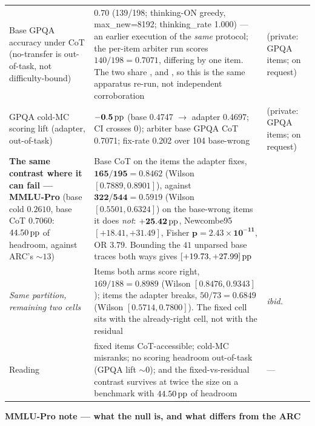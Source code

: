 \begin{table}[tbp]
\begin{threeparttable}
\begin{tabular}{L{5.2cm} L{6.4cm} L{3.2cm}}
\addlinespace
Base GPQA accuracy under CoT (no-transfer is out-of-task, not difficulty-bound) &
$\mathbf{0.70}$ (139/198; thinking-ON greedy, max\_new=8192; thinking\_rate 1.000)
--- an earlier execution of the \emph{same} protocol; the per-item arbiter run scores
$140/198 = 0.7071$, differing by one item. The two share ,
 and , so this is the same apparatus
re-run, not independent corroboration &
 (private: GPQA items; on request)  \\
\addlinespace
GPQA cold-MC scoring lift (adapter, out-of-task) & $\mathbf{-0.5\,\mathrm{pp}}$ (base 0.4747
$\rightarrow$ adapter 0.4697; CI crosses 0); arbiter base GPQA CoT 0.7071; fix-rate
0.202 over 104 base-wrong &  (private: GPQA items; on request) \\
\addlinespace
\textbf{The same contrast where it can fail --- MMLU-Pro} (base cold $0.2610$, base
CoT $0.7060$: $44.50\,\mathrm{pp}$ of headroom, against ARC's ${\sim}13$) & Base CoT on the
items the adapter fixes, $\mathbf{165/195 = 0.8462}$ (Wilson $[0.7889, 0.8901]$),
against $\mathbf{322/544 = 0.5919}$ (Wilson $[0.5501, 0.6324]$) on the base-wrong
items it does \emph{not}: $\mathbf{+25.42\,\mathrm{pp}}$, Newcombe95
$\mathbf{[+18.41, +31.49]}$, Fisher $\mathbf{p=2.43\times10^{-11}}$, OR $3.79$.
Bounding the $41$ unparsed base traces both ways gives $[+19.73, +27.99]\,\mathrm{pp}$ &
 \\
\addlinespace
\emph{Same partition, remaining two cells} & Items both arms score right,
$169/188 = 0.8989$ (Wilson $[0.8476, 0.9343]$); items the adapter breaks,
$50/73 = 0.6849$ (Wilson $[0.5714, 0.7800]$). The fixed cell sits with the
already-right cell, not with the residual & \emph{ibid.} \\
\addlinespace
Reading & fixed items CoT-accessible; cold-MC misranks; no scoring headroom
out-of-task (GPQA lift ${\sim}0$); and the fixed-vs-residual contrast survives at
twice the size on a benchmark with $44.50\,\mathrm{pp}$ of headroom & --- \\
\bottomrule
\end{tabular}
\begin{tablenotes}[flushleft]\footnotesize
\item \textbf{MMLU-Pro note --- what the null is, and what differs from the ARC
}
\end{tablenotes}
\end{threeparttable}
\end{table}
